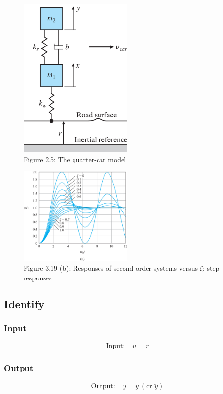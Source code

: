 \documentclass{article}
\begin{document}
\begin{figure}[H]
    \centering
    \includegraphics[width=0.5\textwidth]{fig25.png}
    \caption*{Figure 2.5: The quarter-car model}
\end{figure}

\begin{figure}[H]
    \centering
    \includegraphics[width=0.5\textwidth]{fig319b.png}
    \caption*{Figure 3.19 (b): Responses of second-order systems versus $\zeta$: step responses}
\end{figure}

\subsection{Identify}
\subsubsection{Input}
\begin{align*}
\text{Input: } & u = r
\end{align*}

\subsubsection{Output}
\begin{align*}
\text{Output: } & y = y \ (\text{or } \ddot{y})
\end{align*}
\end{document}
